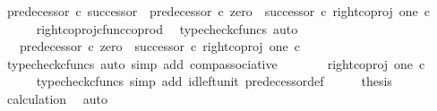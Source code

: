 \begin{isabellebody}
\ {\isachardoublequoteopen}predecessor\ {\isasymcirc}\isactrlsub c\ successor\ {\isacharequal}{\kern0pt}\ predecessor\ {\isasymcirc}\isactrlsub c\ {\isacharparenleft}{\kern0pt}zero\ {\isasymamalg}\ successor{\isacharparenright}{\kern0pt}\ {\isasymcirc}\isactrlsub c\ right{\isacharunderscore}{\kern0pt}coproj\ one\ {\isasymnat}\isactrlsub c{\isachardoublequoteclose}\isanewline
\ \ \ \ \isamarkupfalse%
\ right{\isacharunderscore}{\kern0pt}coproj{\isacharunderscore}{\kern0pt}cfunc{\isacharunderscore}{\kern0pt}coprod\ \isamarkupfalse%
\ {\isacharparenleft}{\kern0pt}typecheck{\isacharunderscore}{\kern0pt}cfuncs{\isacharcomma}{\kern0pt}\ auto{\isacharparenright}{\kern0pt}\isanewline
\ \ \isamarkupfalse%
\ \isamarkupfalse%
\ {\isachardoublequoteopen}{\isachardot}{\kern0pt}{\isachardot}{\kern0pt}{\isachardot}{\kern0pt}\ {\isacharequal}{\kern0pt}\ {\isacharparenleft}{\kern0pt}predecessor\ {\isasymcirc}\isactrlsub c\ {\isacharparenleft}{\kern0pt}zero\ {\isasymamalg}\ successor{\isacharparenright}{\kern0pt}{\isacharparenright}{\kern0pt}\ {\isasymcirc}\isactrlsub c\ right{\isacharunderscore}{\kern0pt}coproj\ one\ {\isasymnat}\isactrlsub c{\isachardoublequoteclose}\isanewline
\ \ \ \ \isamarkupfalse%
\ {\isacharparenleft}{\kern0pt}typecheck{\isacharunderscore}{\kern0pt}cfuncs{\isacharcomma}{\kern0pt}\ auto\ simp\ add{\isacharcolon}{\kern0pt}\ comp{\isacharunderscore}{\kern0pt}associative{}{\isacharparenright}{\kern0pt}\isanewline
\ \ \isamarkupfalse%
\ \isamarkupfalse%
\ {\isachardoublequoteopen}{\isachardot}{\kern0pt}{\isachardot}{\kern0pt}{\isachardot}{\kern0pt}\ {\isacharequal}{\kern0pt}\ right{\isacharunderscore}{\kern0pt}coproj\ one\ {\isasymnat}\isactrlsub c{\isachardoublequoteclose}\isanewline
\ \ \ \ \isamarkupfalse%
\ {\isacharparenleft}{\kern0pt}typecheck{\isacharunderscore}{\kern0pt}cfuncs{\isacharcomma}{\kern0pt}\ simp\ add{\isacharcolon}{\kern0pt}\ id{\isacharunderscore}{\kern0pt}left{\isacharunderscore}{\kern0pt}unit{}\ predecessor{\isacharunderscore}{\kern0pt}def{}{\isacharparenright}{\kern0pt}\isanewline
\ \ \isamarkupfalse%
\ \isamarkupfalse%
\ {\isacharquery}{\kern0pt}thesis\isanewline
\ \ \ \ \isamarkupfalse%
\ calculation\ \isamarkupfalse%
\ auto\isanewline
{}\isamarkupfalse%
%
\endisatagproof
{\isafoldproof}%
%
\isadelimproof
\isanewline
%
\endisadelimproof
\isanewline
{}\isamarkupfalse%

\end{isabellebody}
